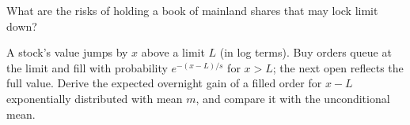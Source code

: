 \begin{interviewq}\label{iq:s1:asia-specific-equity-strategies:5}
What are the risks of holding a book of mainland shares that may lock limit down?
\end{interviewq}

\begin{interviewq}\label{iq:s1:asia-specific-equity-strategies:6}
A stock's value jumps by $x$ above a limit $L$ (in log terms). Buy orders queue at the limit and fill with probability $e^{-(x - L)/s}$ for $x > L$;
the next open reflects the full value. Derive the expected overnight gain of a filled order for $x - L$ exponentially distributed with mean $m$, and
compare it with the unconditional mean.
\end{interviewq}
